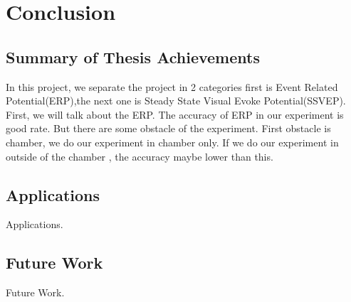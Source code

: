 \chapter{Conclusion}

\label{ch:conclusions}

\section{Summary of Thesis Achievements}

In this project, we separate the project in 2 categories first is Event Related Potential(ERP),the next one is Steady State Visual Evoke Potential(SSVEP). First, we will talk about the ERP. The accuracy of ERP in our experiment is good rate. But there are some obstacle of the experiment. First obstacle is chamber, we do our experiment in chamber only. If we do our experiment in outside of the chamber , the accuracy maybe lower than this. 


\section{Applications}

Applications.


\section{Future Work}

Future Work.